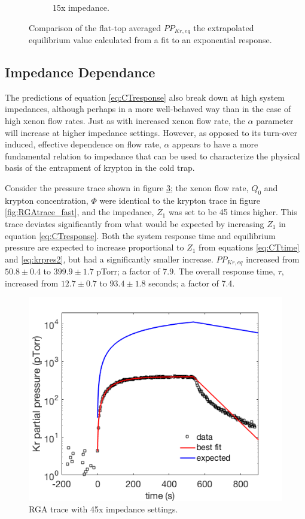 \begin{figure}[h!]
\begin{subfigure}{0.5\textwidth}
  \caption{15x impedance.}
  \label{fig:flowresponse_15x}
\end{subfigure}
\caption{Comparison of the flat-top averaged $PP_{Kr,eq}$ the extrapolated equilibrium value calculated from a fit to an exponential response.} 
\label{fig:flowresponse}
\end{figure}



\subsection{Impedance Dependance}
\label{sec:impedance_real}
The predictions of equation \ref{eq:CTresponse} also break down at high system impedances, although perhaps in a more well-behaved way than in the case of high xenon flow rates. Just as with increased xenon flow rate, the $\alpha$ parameter will increase at higher impedance settings. However, as opposed to its turn-over induced, effective dependence on flow rate, $\alpha$ appears to have a more fundamental relation to impedance that can be used to characterize the physical basis of the entrapment of krypton in the cold trap.

Consider the pressure trace shown in figure \ref{fig:RGAtrace_slow}; the xenon flow rate, $Q_0$ and krypton concentration, $\Phi$ were identical to the krypton trace in figure \ref{fig:RGAtrace_fast}, and the impedance, $Z_1$ was set to be 45 times higher. This trace deviates significantly from what would be expected by increasing $Z_1$ in equation \ref{eq:CTresponse}. Both the system response time and equilibrium pressure are expected to increase proportional to $Z_1$ from equations \ref{eq:CTtime} and \ref{eq:krpres2}, but had a significantly smaller increase. $PP_{Kr,eq}$ increased from $50.8 \pm 0.4$ to $399.9\pm 1.7$ pTorr; a factor of 7.9. The overall response time, $\tau$, increased from $12.7 \pm 0.7$ to $93.4 \pm 1.8$ seconds; a factor of 7.4. 
\begin{figure}[h!]
\centering
\includegraphics[width=\textwidth]{Figures/RGAtrace_fit_slow_wexp.png}
\caption{RGA trace with 45x impedance settings. }
\label{fig:RGAtrace_slow}
\end{figure}

